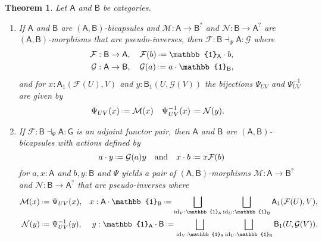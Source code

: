 \documentclass{amsart}
\newcommand{\Cat}[1]{\mathsf{#1}}
\newcommand{\cat}[1]{\Cat{#1}}
\newcommand{\acat}[1]{\mathsf{#1}}
\numberwithin{lstfloat}{section}
\DeclareMathOperator{\id}{id}
\newcommand{\one}{\mathbb{1}}
\newcommand{\defeq}{\mathrel{\hstretch{.13}{=}\hspace{.2ex}{=}}}
\newcommand{\func}[1]{\mathcal{#1}}
\newcommand{\fF}{\func{F}}
\newcommand{\fG}{\func{G}}
\newcommand{\fM}{\func{M}}
\newcommand{\fN}{\func{N}}
\newcommand{\cA}{\cat{A}}
\newcommand{\cB}{\cat{B}}
\newcommand{\cG}{\cat{G}}
\newenvironment{ithm}{\begin{enumerate}[label={\rm(\alph*)}, ref=(\alph*),
      labelwidth=18pt, leftmargin=18pt, topsep=3pt, itemsep=1pt, parsep=2pt]}
      {\end{enumerate}}
\newtheorem{thm}{Theorem}[section]
\theoremstyle{definition}
\theoremstyle{remark}
\numberwithin{equation}{section}
\begin{document}
\pagebreak 
\begin{thm}\label{thm:iso-biacts-adjoints} 
  Let $\cA$ and $\cB$ be categories. 
  \begin{ithm}
    \item\label{thmpart:biaction-to-adjoint}
    If $\cA$ and $\cB$ are $(\cA,\cB)$-bicapsules and $\fM : \cA\to \cB^?$ and
    $\fN:\cB\to \cA^?$ are $(\cA,\cB)$-morphisms that are pseudo-inverses, then
    $\fF:\cB\dashv_{\Psi} \cA:\fG$ where
    \begin{align*}
      \func{F}&: \acat{B}\to\acat{A},\quad \func{F}(b)\defeq \one_{\cA}\cdot b,\\
      \func{G}&: \acat{A}\to\acat{B},\quad \fG(a) \defeq a\cdot \one_{\cB},
    \end{align*}
    and for $x:\acat{A}_1(\func{F}(U),V)$ and $y:\acat{B}_1(U,\func{G}(V))$ the bijections $\Psi_{UV}$ and $\Psi_{UV}^{-1}$ are given by
    \begin{align*}
      \Psi_{UV}(x) &\defeq \mathcal{M}(x) & 
      \Psi_{UV}^{-1}(x) &\defeq \mathcal{N}(y) . 
    \end{align*}
    
    \item 
      If $\fF:\cB \dashv_{\Psi} \cA:\cG$ is an adjoint functor pair, then $\cA$
      and $\cB$ are $(\cA,\cB)$-bicapsules with actions defined by
      \[a\cdot y \defeq \fG(a)y\quad\text{and}\quad x\cdot b  \defeq x\fF(b)\]
      for $a,x: \cA$ and $b,y:\cB$ and $\Psi$ yields a pair
      of $(\cA,\cB)$-morphisms $\fM:\cA\to \cB^?$ and $\fN:\cB\to \cA^?$ that are
      pseudo-inverses where 
    \begin{align*}
      \fM(x) & \defeq \Psi_{UV}(x), & x:\cA\cdot \one_{\cB}\defeq\bigsqcup_{\id_V:\one_{\cA}}\bigsqcup_{\id_U:\one_{\cB}}\cA_1(\fF(U),V),\\
      \fN(y) & \defeq \Psi^{-1}_{UV}(y), & y:\one_{\cA}\cdot \cB\defeq\bigsqcup_{\id_V:\one_{\cA}}\bigsqcup_{\id_U:\one_{\cB}}\cB_1(U,\fG(V)).
    \end{align*}
  \end{ithm}
\end{thm}
\end{document}

